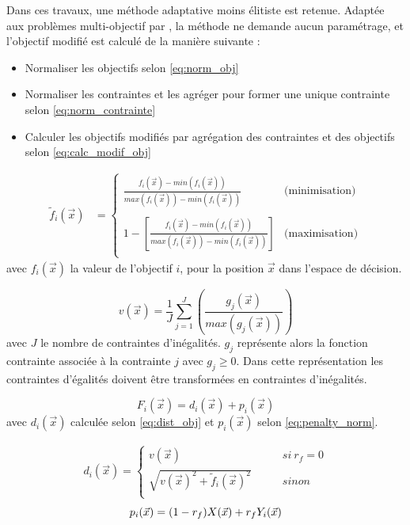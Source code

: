 Dans ces travaux, une méthode adaptative moins élitiste est retenue. Adaptée
aux problèmes multi-objectif par \cite{Woldesenbet20073077}, la méthode ne demande
aucun paramétrage, et l’objectif modifié est calculé de la manière suivante :
\begin{itemize}
  \item Normaliser les objectifs selon \eqref{eq:norm_obj}
  \item Normaliser les contraintes et les agréger pour former une unique contrainte selon \eqref{eq:norm_contrainte}
  \item Calculer les objectifs modifiés par agrégation des contraintes et des objectifs selon \eqref{eq:calc_modif_obj}
\end{itemize}

\begin{align}\label{eq:norm_obj}
  \tilde{f}_{i}(\vec{x}) &= \begin{cases}
    \frac{f_{i}(\vec{x}) - min(f_{i}(\vec{x}))}{max(f_{i}(\vec{x})) - min(f_{i}(\vec{x}))}
    & \text{(minimisation)} \\ \\ 1 - \left[\frac{f_{i}(\vec{x}) -
    min(f_{i}(\vec{x}))}{max(f_{i}(\vec{x})) - min(f_{i}(\vec{x}))}\right] &
    \text{(maximisation)} \\
  \end{cases}
\end{align}
avec $f_{i}(\vec{x})$ la valeur de l’objectif $i$, pour la position $\vec{x}$ dans l’espace de décision.

\begin{equation}\label{eq:norm_contrainte}
  v(\vec{x}) = \frac{1}{J} \sum_{j=1}^{J} \left(\frac{g_{j}(\vec{x})}{max(g_{j}(\vec{x}))}\right)
\end{equation}
avec $J$ le nombre de contraintes d’inégalités. $g_{j}$ représente alors la fonction contrainte
associée à la contrainte $j$ avec $g_{j} \geq 0$. Dans cette représentation les contraintes
d’égalités doivent être transformées en contraintes d’inégalités.

\begin{equation}\label{eq:calc_modif_obj}
  F_{i}(\vec{x}) = d_{i}(\vec{x}) + p_{i}(\vec{x})
\end{equation}
avec $d_{i}(\vec{x})$ calculée selon \eqref{eq:dist_obj} et $ p_{i}(\vec{x})$ selon \eqref{eq:penalty_norm}.


\begin{align}\label{eq:dist_obj}
  d_{i}(\vec{x}) = \begin{cases}
                          v(\vec{x})                                     & \qquad si\  r_{f} = 0 \\
                          \sqrt{v(\vec{x})^2 + \tilde{f}_{i}(\vec{x})^2} & \qquad sinon          \\
                    \end{cases}
\end{align}
\begin{equation}\label{eq:penalty_norm}
  p_{i}(\vec{x}) = (1 - r_{f})  X(\vec{x}) + r_{f} Y_{i}(\vec{x}) \\
\end{equation}

